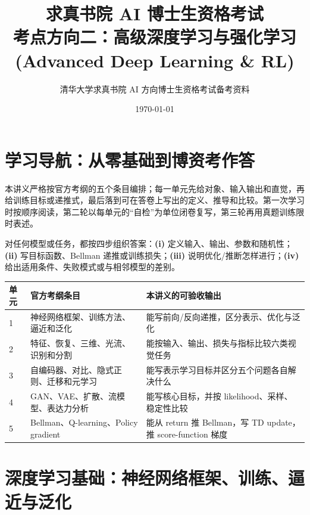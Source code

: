 \documentclass[11pt]{ctexart}
\title{\bfseries 求真书院 AI 博士生资格考试\\考点方向二：高级深度学习与强化学习 (Advanced Deep Learning \& RL)}
\author{清华大学求真书院 AI 方向博士生资格考试备考资料}
\date{\today}
\begin{document}
\maketitle
\tableofcontents

\label{sec:deep_rl}
\section*{学习导航：从零基础到博资考作答}

本讲义严格按官方考纲的五个条目编排；每一单元先给对象、输入输出和直觉，再给训练目标或递推式，最后落到可在答卷上写出的定义、推导和比较。第一次学习时按顺序阅读，第二轮以每单元的“自检”为单位闭卷复写，第三轮再用真题训练限时表述。

\begin{teaching}[统一答题框架]
对任何模型或任务，都按四步组织答案：\textbf{(i)} 定义输入、输出、参数和随机性；\textbf{(ii)} 写目标函数、Bellman 递推或训练损失；\textbf{(iii)} 说明优化/推断怎样进行；\textbf{(iv)} 给出适用条件、失败模式或与相邻模型的差别。
\end{teaching}

\begin{center}
\small
\begin{tabular}{p{}p{}p{}}
\toprule
单元 & 官方考纲条目 & 本讲义的可验收输出 \\
\midrule
1 & 神经网络框架、训练方法、逼近和泛化 & 能写前向/反向递推，区分表示、优化与泛化 \\
2 & 特征、恢复、三维、光流、识别和分割 & 能按输入、输出、损失与指标比较六类视觉任务 \\
3 & 自编码器、对比、隐式正则、迁移和元学习 & 能写表示学习目标并区分五个问题各自解决什么 \\
4 & GAN、VAE、扩散、流模型、表达力分析 & 能写核心目标，并按 likelihood、采样、稳定性比较 \\
5 & Bellman、Q-learning、Policy gradient & 能从 return 推 Bellman，写 TD update，推 score-function 梯度 \\
\bottomrule
\end{tabular}
\end{center}

\section{深度学习基础：神经网络框架、训练、逼近与泛化}

\end{document}
